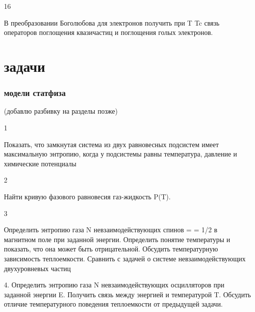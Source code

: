 \documentclass[a4paper,12pt]{article} %
\begin{document}
\begin{task}

16




\end{task}


\begin{task}

В преобразовании Боголюбова для электронов получить при T  Tc связь операторов поглощения квазичастиц и поглощения голых электронов.


\end{task}




\clearpage
\part{задачи}

\section{модели статфиза}

(добавлю разбивку на разделы позже)

\begin{task}
1

Показать, что замкнутая система из двух равновесных подсистем имеет максимальную энтропию, когда у подсистемы равны температура, давление и химические потенциалы


\end{task}


\begin{task}
2

Найти кривую фазового равновесия газ-жидкость P(T).


\end{task}


\begin{task}

3

Определить энтропию газа N невзаимодействующих спинов  = = 1/2 в магнитном поле при заданной энергии. 
Определить понятие температуры и показать, что она может быть отрицательной. Обсудить температурную зависимость теплоемкости. Сравнить с задачей о системе невзаимодействующих двухуровневых частиц


\end{task}


\begin{task}
4. Определить энтропию газа N невзаимодействующих осцилляторов при заданной энергии E. Получить связь между энергией и температурой T. Обсудить отличие температурного поведения теплоемкости от предыдущей задачи.



\end{task}
\end{document}
